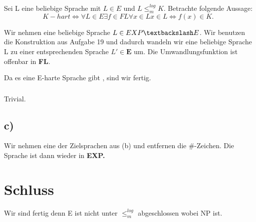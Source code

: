 \documentclass{article}
\begin{document}
			\subsubsection{\rightarrow}
				Sei L eine beliebige Sprache mit $L \in E$ und $L \leq_m^{log} K$.
				Betrachte folgende Aussage:
					\[
					K-hart \iff \forall L \in E \exists f \in FL \forall x \in L x \in L \iff f(x) \in K.
					\]

				Wir nehmen eine beliebige Sprache $L \in EXP\textbackslash E$. Wir benutzen die Konstruktion aus Aufgabe 19 und dadurch wandeln wir eine beliebige Sprache L zu einer entsprechenden Sprache $L' \in \textbf{E}$
				um. Die Umwandlungsfunktion ist offenbar in \textbf{FL}.

				Da es eine E-harte Sprache gibt , sind wir fertig.
			\subsubsection{\leftarrow}
				Trivial.
		\subsection*{c)}
			Wir nehmen eine der Zielsprachen aus (b) und entfernen die \#-Zeichen. Die Sprache ist dann wieder in \textbf{EXP.}

	\section*{Schluss}
		Wir sind fertig denn E ist nicht unter $\leq_m^{log}$ abgeschlossen wobei NP ist.
\end{document}
